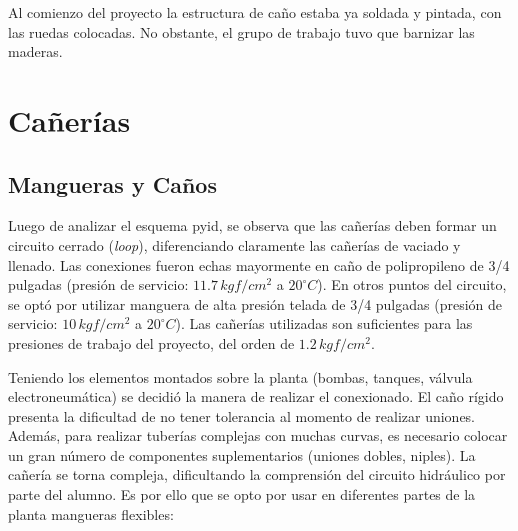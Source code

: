 Al comienzo del proyecto la estructura de caño estaba ya soldada y pintada, con
las ruedas colocadas.
No obstante, el grupo de trabajo tuvo que barnizar las maderas.

\section{Cañerías}
\label{sec:Canerias}

\subsection{Mangueras y Caños}
Luego de analizar el esquema \gls{pyid}, se observa que las cañerías deben
formar un circuito cerrado (\emph{loop}), diferenciando
claramente las cañerías de vaciado y llenado.
Las conexiones fueron echas mayormente en caño de polipropileno de 3/4
pulgadas (presión de servicio: $11.7\,kgf/cm^2$ a $20^\circ C$).
En otros puntos del circuito, se optó por utilizar manguera de alta presión
telada de 3/4 pulgadas (presión de servicio: $10\,kgf/cm^2$ a $20^\circ C$).
Las cañerías utilizadas son suficientes para las presiones de trabajo del
proyecto, del orden de $1.2\,kgf/cm^2$.

Teniendo los elementos montados sobre la planta (bombas, tanques, válvula
electroneumática) se decidió la manera de realizar el conexionado.
El caño rígido presenta la dificultad de no tener tolerancia al momento de
realizar uniones.
Además, para realizar tuberías complejas con muchas curvas, es necesario
colocar un gran número de componentes suplementarios (uniones dobles,
niples).
La cañería se torna compleja, dificultando la comprensión del circuito
hidráulico por parte del alumno.
Es por ello que se opto por usar en diferentes partes de la planta mangueras
flexibles:

